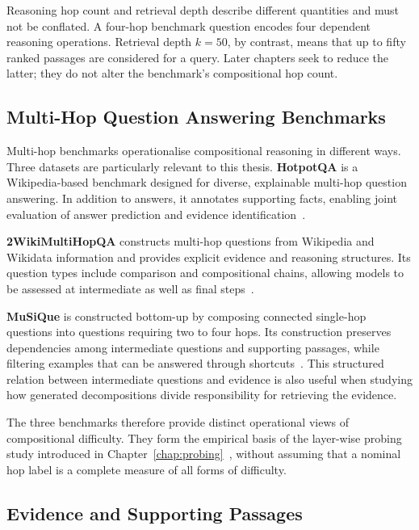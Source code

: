Reasoning hop count and retrieval depth describe different quantities and must
not be conflated. A four-hop benchmark question encodes four dependent reasoning operations.
Retrieval depth \(k=50\), by contrast, means that up to fifty ranked passages are
considered for a query. Later chapters seek to reduce the latter; they do not
alter the benchmark's compositional hop count.

\subsection{Multi-Hop Question Answering Benchmarks}
\label{subsec:multihop-benchmarks}

Multi-hop benchmarks operationalise compositional reasoning in different ways.
Three datasets are particularly relevant to this thesis. \textbf{HotpotQA} is a
Wikipedia-based benchmark designed for diverse, explainable multi-hop question
answering. In addition to answers, it annotates supporting facts, enabling joint
evaluation of answer prediction and evidence identification~\cite{yang2018hotpotqa}.

\textbf{2WikiMultiHopQA} constructs multi-hop questions from Wikipedia and
Wikidata information and provides explicit evidence and reasoning structures.
Its question types include comparison and compositional chains, allowing models
to be assessed at intermediate as well as final steps~\cite{ho2020constructing}.

\textbf{MuSiQue} is constructed bottom-up by composing connected single-hop
questions into questions requiring two to four hops. Its construction preserves
dependencies among intermediate questions and supporting passages, while
filtering examples that can be answered through shortcuts~\cite{trivedi2022musique}.
This structured relation between intermediate questions and evidence is also
useful when studying how generated decompositions divide responsibility for
retrieving the evidence.

The three benchmarks therefore provide distinct operational views of
compositional difficulty. They form the empirical basis of the layer-wise
probing study introduced in Chapter~\ref{chap:probing}~\cite{abdelhedi2026probing},
without assuming that a nominal hop label is a complete measure of all forms of
difficulty.

\subsection{Evidence and Supporting Passages}
\label{subsec:evidence}

